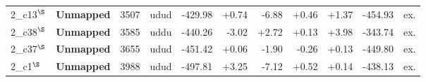 {\begin{longtable}{@{\extracolsep{\fill}}llrlrrrrrrr@{}}
2\_c13$^{\S}$ & \textcolor{famUnmapped}{\textbf{Unmapped}} & 3507 & udud & -429.98 & +0.74 & -6.88 & +0.46 & +1.37 & -454.93 & ex. \\
2\_c38$^{\S}$ & \textcolor{famUnmapped}{\textbf{Unmapped}} & 3585 & uddu & -440.26 & -3.02 & +2.72 & +0.13 & +3.98 & -343.74 & ex. \\
2\_c37$^{\S}$ & \textcolor{famUnmapped}{\textbf{Unmapped}} & 3655 & udud & -451.42 & +0.06 & -1.90 & -0.26 & +0.13 & -449.80 & ex. \\
2\_c1$^{\S}$ & \textcolor{famUnmapped}{\textbf{Unmapped}} & 3988 & udud & -497.81 & +3.25 & -7.12 & +0.52 & +0.14 & -438.13 & ex. \\
\end{longtable}}
